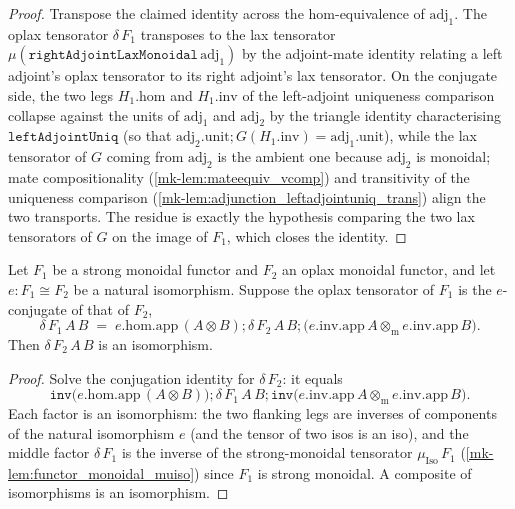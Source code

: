 \begin{proof}
  \leanok
  Transpose the claimed identity across the hom-equivalence of \(\mathrm{adj}_1\). The oplax
  tensorator \(\delta\,F_1\) transposes to the lax tensorator
  \(\mu(\mathtt{rightAdjointLaxMonoidal}\,\mathrm{adj}_1)\) by the adjoint-mate identity relating a
  left adjoint's oplax tensorator to its right adjoint's lax tensorator. On the conjugate side, the
  two legs \(H_1.\mathrm{hom}\) and \(H_1.\mathrm{inv}\) of the left-adjoint uniqueness comparison
  collapse against the units of \(\mathrm{adj}_1\) and \(\mathrm{adj}_2\) by the triangle identity
  characterising \(\mathtt{leftAdjointUniq}\) (so that
  \(\mathrm{adj}_2.\mathrm{unit} \mathbin{;} G(H_1.\mathrm{inv}) = \mathrm{adj}_1.\mathrm{unit}\)),
  while the lax tensorator of \(G\) coming from \(\mathrm{adj}_2\) is the ambient one because
  \(\mathrm{adj}_2\) is monoidal; mate compositionality
  (\ref{mk-lem:mateequiv_vcomp}) and transitivity of the uniqueness comparison
  (\ref{mk-lem:adjunction_leftadjointuniq_trans}) align the two transports. The residue is exactly the
  hypothesis comparing the two lax tensorators of \(G\) on the image of \(F_1\), which closes the
  identity.
\end{proof}

\begin{lemma}\label{mk-lem:isiso_oplaxdelta_of_conj}
  \leanok

  Let \(F_1\) be a strong monoidal functor and \(F_2\) an oplax monoidal functor, and let
  \(e : F_1 \cong F_2\) be a natural isomorphism. Suppose the oplax tensorator of \(F_1\) is the
  \(e\)-conjugate of that of \(F_2\),
  \[
    \delta\,F_1\,A\,B
      \;=\; e.\mathrm{hom}.\mathrm{app}\,(A \otimes B)
        \mathbin{;} \delta\,F_2\,A\,B
        \mathbin{;} \bigl(e.\mathrm{inv}.\mathrm{app}\,A \otimes_{\mathrm m}
          e.\mathrm{inv}.\mathrm{app}\,B\bigr).
  \]
  Then \(\delta\,F_2\,A\,B\) is an isomorphism.
\end{lemma}
\begin{proof}
  \leanok
  Solve the conjugation identity for \(\delta\,F_2\): it equals
  \[
    \mathtt{inv}\bigl(e.\mathrm{hom}.\mathrm{app}\,(A \otimes B)\bigr)
      \mathbin{;} \delta\,F_1\,A\,B
      \mathbin{;} \mathtt{inv}\bigl(e.\mathrm{inv}.\mathrm{app}\,A \otimes_{\mathrm m}
        e.\mathrm{inv}.\mathrm{app}\,B\bigr).
  \]
  Each factor is an isomorphism: the two flanking legs are inverses of components of the natural
  isomorphism \(e\) (and the tensor of two isos is an iso), and the middle factor \(\delta\,F_1\) is
  the inverse of the strong-monoidal tensorator \(\mu_{\mathrm{Iso}}\,F_1\)
  (\ref{mk-lem:functor_monoidal_muiso}) since \(F_1\) is strong monoidal. A composite of isomorphisms
  is an isomorphism.
\end{proof}


